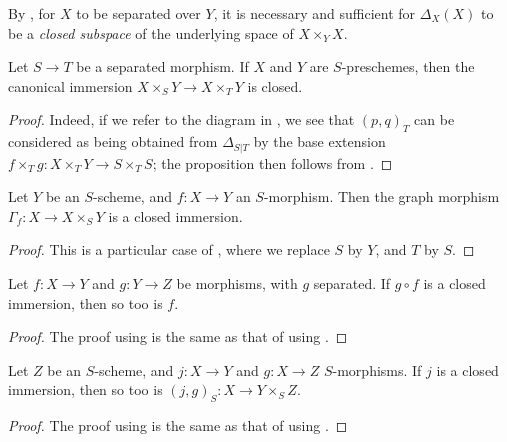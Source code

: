 By , for $X$ to be separated over $Y$, it is necessary and sufficient for $\Delta_X(X)$ to be a \emph{closed subspace} of the underlying space of $X\times_Y X$.

\begin{proposition}[5.4.2]
\label{I.5.4.2}
Let $S\to T$ be a separated morphism.
If $X$ and $Y$ are $S$-preschemes, then the canonical immersion $X\times_S Y\to X\times_T Y$  is closed.
\end{proposition}

\begin{proof}
Indeed, if we refer to the diagram in , we see that $(p,q)_T$ can be considered as being obtained from $\Delta_{S|T}$ by the base extension $f\times_T g:X\times_T Y\to S\times_T S$;
the proposition then follows from .
\end{proof}

\begin{corollary}[5.4.3]
\label{I.5.4.3}
Let $Y$ be an $S$-scheme, and $f:X\to Y$ an $S$-morphism.
Then the graph morphism $\Gamma_f:X\to X\times_S Y$  is a closed immersion.
\end{corollary}

\begin{proof}
This is a particular case of , where we replace $S$ by $Y$, and $T$ by $S$.
\end{proof}

\begin{corollary}[5.4.4]
\label{I.5.4.4}
Let $f:X\to Y$ and $g:Y\to Z$ be morphisms, with $g$ separated.
If $g\circ f$ is a closed immersion, then so too is $f$.
\end{corollary}

\begin{proof}
The proof using  is the same as that of  using .
\end{proof}

\begin{corollary}[5.4.5]
\label{I.5.4.5}
Let $Z$ be an $S$-scheme, and $j:X\to Y$ and $g:X\to Z$ $S$-morphisms.
If $j$ is a closed immersion, then so too is $(j,g)_S:X\to Y\times_S Z$.
\end{corollary}

\begin{proof}
The proof using  is the same as that of  using .
\end{proof}

